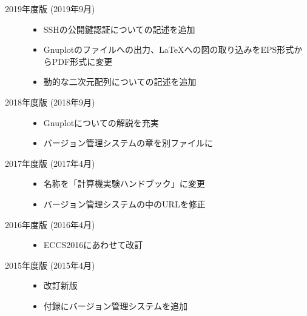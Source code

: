 \begin{description}
    \item[2019年度版 (2019年9月)] \mbox{}

          \begin{itemize}
              \item SSHの公開鍵認証についての記述を追加
              \item Gnuplotのファイルへの出力、\LaTeX への図の取り込みをEPS形式からPDF形式に変更
              \item 動的な二次元配列についての記述を追加
          \end{itemize}

    \item[2018年度版 (2018年9月)] \mbox{}

          \begin{itemize}
              \item Gnuplotについての解説を充実
              \item バージョン管理システムの章を別ファイルに
          \end{itemize}

    \item[2017年度版 (2017年4月)] \mbox{}

          \begin{itemize}
              \item 名称を「計算機実験ハンドブック」に変更
              \item バージョン管理システムの中のURLを修正
          \end{itemize}

    \item[2016年度版 (2016年4月)] \mbox{}

          \begin{itemize}
              \item ECCS2016にあわせて改訂
          \end{itemize}

    \item[2015年度版 (2015年4月)] \mbox{}

          \begin{itemize}
              \item 改訂新版
              \item 付録にバージョン管理システムを追加
          \end{itemize}

\end{description}

